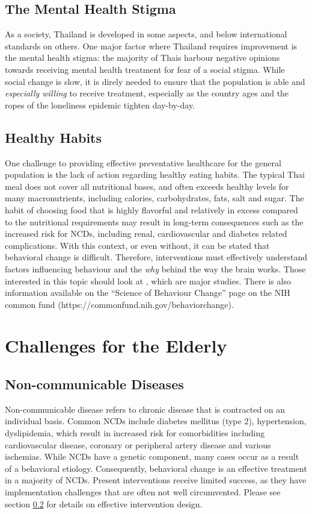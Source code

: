\documentclass[10pt, a4paper, twocolumn]{article}
\begin{document}
\subsection{The Mental Health Stigma}
As a society, Thailand is developed in some aspects, and below international standards on others. One major factor
where Thailand requires improvement is the mental health stigma: the majority of Thais harbour negative opinions towards
receiving mental health treatment for fear of a social stigma. While social change is slow, it is direly needed to ensure
that the population is able and \emph{especially willing} to receive treatment, especially as the country ages and the
ropes of the loneliness epidemic tighten day-by-day.
\subsection{Healthy Habits} \label{habit}
One challenge to providing effective preventative healthcare for the general population is the lack of
action regarding healthy eating habits. The typical Thai meal does not cover all nutritional bases, and often
exceeds healthy levels for many macronutrients, including calories, carbohydrates, fats, salt and sugar. The habit of choosing
food that is highly flavorful and relatively in excess compared to the nutritional requirements may result in long-term
consequences such as the increased risk for NCDs, including renal, cardiovascular and diabetes related complications.
With this context, or even without, it can be stated that behavioral change is difficult. Therefore, interventions must
effectively understand factors influencing behaviour and the \emph{why} behind the way the brain works. Those interested
in this topic should look at \citet{loucksMindfulnessBasedBloodPressure2019, halpernRandomizedTrialFour2015, davidsonUnderstandingPredictingHealth2020},
which are major studies. There is also information available on the ``Science of Behaviour Change'' page on the NIH common fund (https://commonfund.nih.gov/behaviorchange).
\section{Challenges for the Elderly}
\subsection{Non-communicable Diseases}
Non-communicable disease refers to chronic disease that is contracted on an individual basis.
Common NCDs include diabetes mellitus (type 2), hypertension, dyslipidemia, which result in
increased risk for comorbidities including cardiovascular disease, coronary or peripheral
artery disease and various ischemias. While NCDs have a genetic component, many cases occur
as a result of a behavioral etiology. Consequently, behavioral change is an effective treatment
in a majority of NCDs. Present interventions receive limited success, as they have implementation
challenges that are often not well circumvented. Please see section \ref{habit} for details on effective intervention design.
\end{document}
